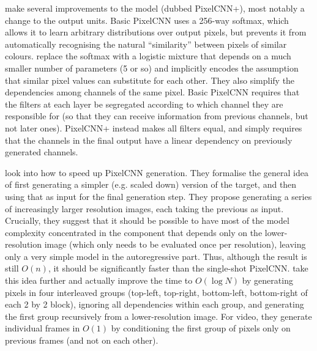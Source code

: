 \documentclass[11pt, a4paper]{book}
\newcommand{\nquote}[1]{``{#1}''}
\begin{document}
\citet{pixelcnn++} make several improvements to the model (dubbed PixelCNN+), most notably a change to the output units. Basic PixelCNN uses a 256-way softmax, which allows it to learn arbitrary distributions over output pixels, but prevents it from automatically recognising the natural \nquote{similarity} between pixels of similar colours. \citet{pixelcnn++} replace the softmax with a logistic mixture that depends on a much smaller number of parameters (5 or so) and implicitly encodes the assumption that similar pixel values can substitute for each other. They also simplify the dependencies among channels of the same pixel. Basic PixelCNN requires that the filters at each layer be segregated according to which channel they are responsible for (so that they can receive information from previous channels, but not later ones). PixelCNN+ instead makes all filters equal, and simply requires that the channels in the final output have a linear dependency on previously generated channels.

\citet{auxiliary} look into how to speed up PixelCNN generation. They formalise the general idea of first generating a simpler (e.g. scaled down) version of the target, and then using that as input for the final generation step. They propose generating a series of increasingly larger resolution images, each taking the previous as input. Crucially, they suggest that it should be possible to have most of the model complexity concentrated in the component that depends only on the lower-resolution image (which only needs to be evaluated once per resolution), leaving only a very simple model in the autoregressive part. Thus, although the result is still $O(n)$, it should be significantly faster than the single-shot PixelCNN. \citet{multiscale} take this idea further and actually improve the time to $O(\log N)$ by generating pixels in four interleaved groups (top-left, top-right, bottom-left, bottom-right of each 2 by 2 block), ignoring all dependencies within each group, and generating the first group recursively from a lower-resolution image. For video, they generate individual frames in $O(1)$ by conditioning the first group of pixels only on previous frames (and not on each other).
\end{document}
